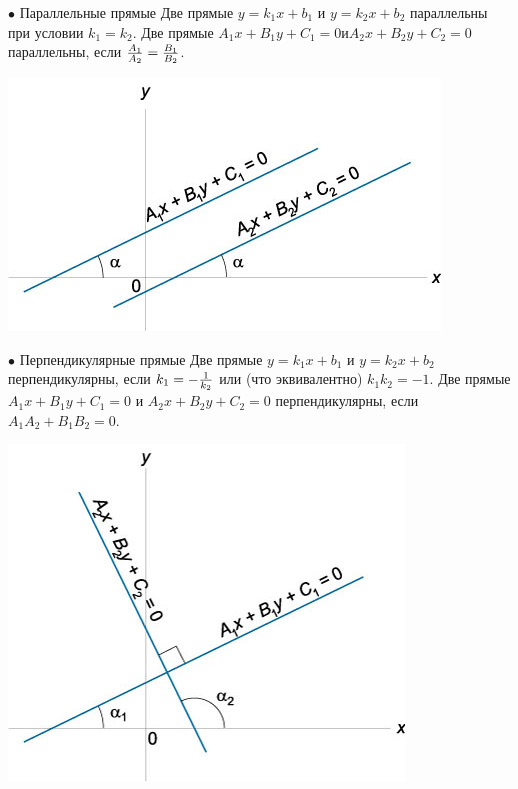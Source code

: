 \documentclass[oneside]{book}
\begin{document}
\begin{enumerate}
\begin{itemize}
\begin{enumerate}
$\bullet$ Параллельные прямые
Две прямые $y = {k_1}x + {b_1} $ и $ y = {k_2}x + {b_2}$ параллельны при условии
${k_1} = {k_2}$.
Две прямые ${A_1}x + {B_1}y + {C_1} = 0 и {A_2}x + {B_2}y + {C_2} = 0$ параллельны, если
$\large\frac{{{A_1}}}{{{A_2}}}\normalsize = \large\frac{{{B_1}}}{{{B_2}}}\normalsize$.
\begin{center}
\includegraphics[scale=0.4]{./pics/15.jpg}
\end{center}

$\bullet$ Перпендикулярные прямые
Две прямые $y = {k_1}x + {b_1} $ и $ y = {k_2}x + {b_2}$ перпендикулярны, если
${k_1} = - \large\frac{1}{{{k_2}}}\normalsize$ или (что эквивалентно) ${k_1}{k_2} = - 1$.
Две прямые ${A_1}x + {B_1}y + {C_1} = 0$ и ${A_2}x + {B_2}y + {C_2} = 0$ перпендикулярны, если
${A_1}{A_2} + {B_1}{B_2} = 0$.
\begin{center}
\includegraphics[scale=0.4]{./pics/16.jpg}
\end{center}


\end{enumerate}
\end{itemize}
\end{enumerate}
\end{document}
